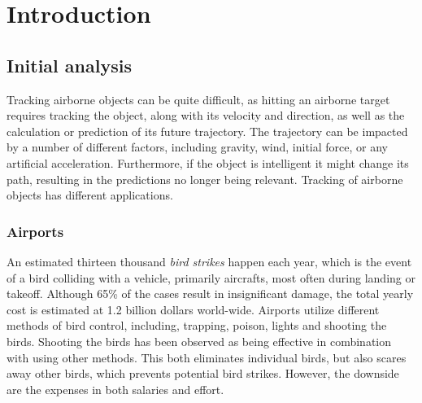 \chapter{Introduction}
\section{Initial analysis}
Tracking airborne objects can be quite difficult, as hitting an airborne target requires tracking the object, along with its velocity and direction, as well as the calculation or prediction of its future trajectory.
The trajectory can be impacted by a number of different factors, including gravity, wind, initial force, or any artificial acceleration.
Furthermore, if the object is intelligent it might change its path, resulting in the predictions no longer being relevant.
Tracking of airborne objects has different applications.
\subsection{Airports}
An estimated thirteen thousand \textit{bird strikes} happen each year, which is the event of a bird colliding with a vehicle, primarily aircrafts\cite{WildlifeStrikeReport}, most often during landing or takeoff\cite{CostOfBirdstrikes}.
Although 65\% of the cases result in insignificant damage, the total yearly cost is estimated at 1.2 billion dollars world-wide\cite{CostOfBirdstrikes}.
Airports utilize different methods of bird control, including, trapping, poison, lights and shooting the birds\cite{BirdControlAtAirports}.
Shooting the birds has been observed as being effective in combination with using other methods.
This both eliminates individual birds, but also scares away other birds, which prevents potential bird strikes.
However, the downside are the expenses in both salaries and effort.

